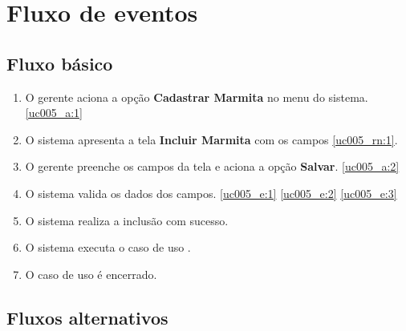 \section{Fluxo de eventos}

\subsection{Fluxo básico}

\begin{enumerate}[label=P\arabic*]
	\item O gerente aciona a opção \textbf{Cadastrar Marmita} no menu do sistema. \ref{uc005_a:1}
	\item O sistema apresenta a tela \textbf{Incluir Marmita} com os campos \ref{uc005_rn:1}. \label{uc005_p:2}
	\item O gerente preenche os campos da tela e aciona a opção \textbf{Salvar}. \label{uc005_p:3} \ref{uc005_a:2}
	\item O sistema valida os dados dos campos. \ref{uc005_e:1} \ref{uc005_e:2} \ref{uc005_e:3}
	\item O sistema realiza a inclusão com sucesso.
	\item O sistema executa o caso de uso .
	\item O caso de uso é encerrado.	
\end{enumerate}

\subsection{Fluxos alternativos}

